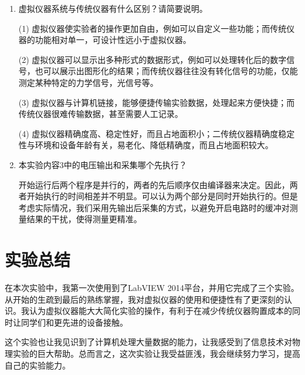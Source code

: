 \documentclass[11pt]{article}
\begin{document}
\begin{enumerate}    
    \item 虚拟仪器系统与传统仪器有什么区别？请简要说明。
    
    (1) 虚拟仪器使实验者的操作更加自由，例如可以自定义一些功能；而传统仪器的功能相对单一，可设计性远小于虚拟仪器。

    (2) 虚拟仪器可以显示出多种形式的数据形式，例如可以处理转化后的数字信号，也可以展示出图形化的结果；而传统仪器往往没有转化信号的功能，仅能测定某种特定的力学信号，光信号等。
    
    (3) 虚拟仪器与计算机链接，能够便捷传输实验数据，处理起来方便快捷；而传统仪器很难传输数据，甚至需要人工记录。

    (4) 虚拟仪器精确度高、稳定性好，而且占地面积小；二传统仪器精确度稳定性与环境和设备年龄有关，易老化、降低精确度，而且占地面积较大。
    
    \item 本实验内容3中的电压输出和采集哪个先执行？
    
    开始运行后两个程序是并行的，两者的先后顺序仅由编译器来决定。因此，两者开始执行的时间相差并不明显。可以认为两个部分是同时开始执行的。但是考虑实际情况，我们采用先输出后采集的方式，以避免开启电路时的缓冲对测量结果的干扰，使得测量更精准。

\end{enumerate}

\section{实验总结}

在本次实验中，我第一次使用到了LabVIEW 2014平台，并用它完成了三个实验。从开始的生疏到最后的熟练掌握，我对虚拟仪器的使用和便捷性有了更深刻的认识。我认为虚拟仪器能大大简化实验的操作，有利于在减少传统仪器购置成本的同时让同学们和更先进的设备接触。

这个实验也让我见识到了计算机处理大量数据的能力，让我感受到了信息技术对物理实验的巨大帮助。总而言之，这次实验让我受益匪浅，我会继续努力学习，提高自己的实验能力。
\end{document}
